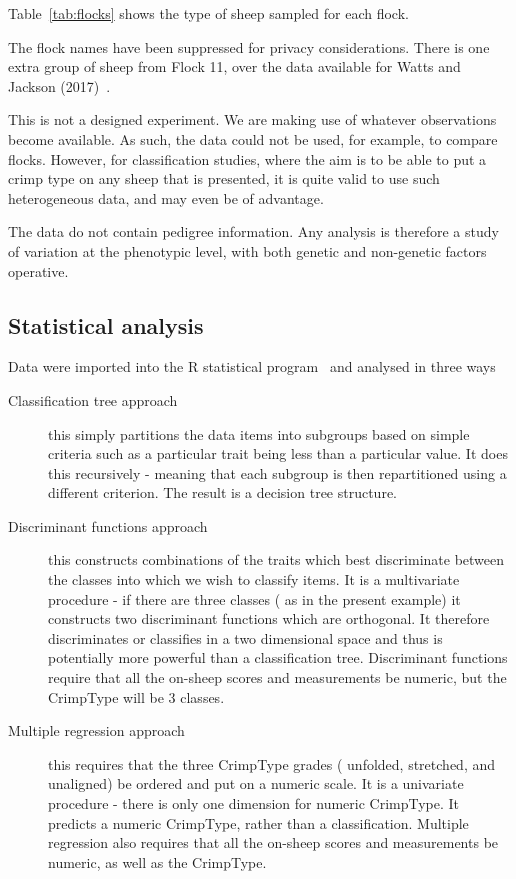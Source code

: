 \documentclass[titlepage]{article}  %
\begin{document}
Table~\ref{tab:flocks} shows the type of sheep sampled for each flock.

The flock names have been suppressed for privacy considerations. There is one extra group of sheep from Flock 11, over the data available for Watts and Jackson (2017)~\cite{watt:17}.
 
This is not a designed experiment. We are making use of whatever observations become available. As such, the data could not be used, for example, to compare flocks. However, for classification studies, where the aim is to be able to put a crimp type on any sheep that is presented, it is quite valid to use such heterogeneous data, and may even be of advantage.

The data do not contain pedigree information. Any analysis is therefore a study of variation at the phenotypic level, with both genetic and non-genetic factors operative.

\subsection{Statistical analysis}

 Data were imported into the R statistical program~\cite{rprog:13} and analysed in three ways
\begin{description}
\item[Classification tree approach]  this simply partitions the data items into subgroups based on simple criteria such as a particular trait being less than a particular value. It does this recursively - meaning that each subgroup is then repartitioned using a different criterion. The result is a decision tree structure.
\item[Discriminant functions approach] this constructs combinations of the traits which best discriminate between the classes into which we wish to classify items.  It is a multivariate procedure - if there are three classes ( as in the present example) it constructs two discriminant functions which are orthogonal. It therefore discriminates or classifies in a two dimensional space and thus is potentially more powerful than a classification tree. Discriminant functions require that all the on-sheep scores and measurements be numeric, but the CrimpType will be 3 classes.
\item[Multiple regression approach] this requires that the three CrimpType grades ( unfolded, stretched, and unaligned) be ordered and put on a numeric scale.  It is a univariate procedure - there is only one dimension for numeric CrimpType. It predicts a numeric CrimpType, rather than a classification. Multiple regression also requires that all the on-sheep scores and measurements be numeric, as well as the CrimpType.
\end{description}
\end{document}
